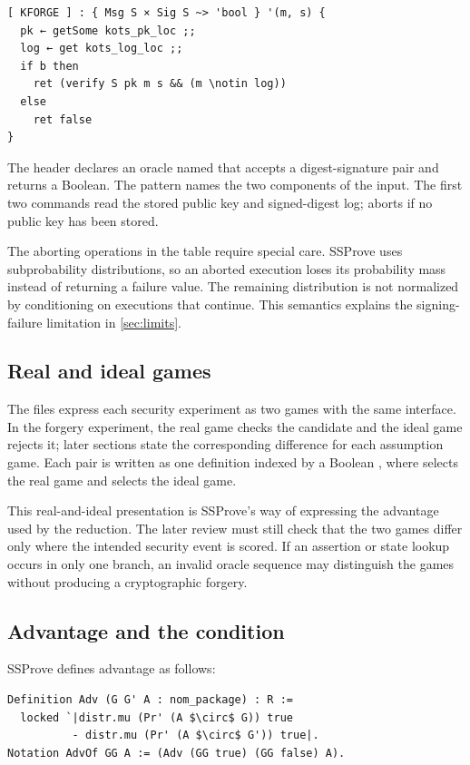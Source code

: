 \documentclass[11pt,a4paper]{article}
\theoremstyle{plain}
\theoremstyle{definition}
\DeclareRobustCommand{\coq}[1]{\texttt{\detokenize{#1}}}
\newcommand{\SSProve}{\textsf{SSProve}\xspace}
\begin{document}
\begin{lstlisting}[numbers=none]
[ KFORGE ] : { Msg S × Sig S ~> 'bool } '(m, s) {
  pk ← getSome kots_pk_loc ;;
  log ← get kots_log_loc ;;
  if b then
    ret (verify S pk m s && (m \notin log))
  else
    ret false
}
\end{lstlisting}

The header declares an oracle named \coq{KFORGE} that accepts a digest-signature pair and returns a Boolean.
The pattern \coq{'(m, s)} names the two components of the input.
The first two commands read the stored public key and signed-digest log; \coq{getSome} aborts if no public key has been stored.

The aborting operations in the table require special care.
\SSProve uses subprobability distributions, so an aborted execution loses its probability mass instead of returning a failure value.
The remaining distribution is not normalized by conditioning on executions that continue.
This semantics explains the signing-failure limitation in \cref{sec:limits}.

\subsection{Real and ideal games}

The files express each security experiment as two games with the same interface.
In the forgery experiment, the real game checks the candidate and the ideal game rejects it; later sections state the corresponding difference for each assumption game.
Each pair is written as one definition indexed by a Boolean \coq{b}, where \coq{true} selects the real game and \coq{false} selects the ideal game.

This real-and-ideal presentation is \SSProve's way of expressing the advantage used by the reduction.
The later review must still check that the two games differ only where the intended security event is scored.
If an assertion or state lookup occurs in only one branch, an invalid oracle sequence may distinguish the games without producing a cryptographic forgery.

\subsection{Advantage and the \coq{ValidPackage} condition}
\label{sec:ssprove-adv}

\SSProve defines advantage as follows:

\begin{lstlisting}[numbers=none,mathescape=true,caption={The elaborated \SSProve advantage definition.},label={lst:adv}]
Definition Adv (G G' A : nom_package) : R :=
  locked `|distr.mu (Pr' (A $\circ$ G)) true
          - distr.mu (Pr' (A $\circ$ G')) true|.
Notation AdvOf GG A := (Adv (GG true) (GG false) A).
\end{lstlisting}
\end{document}
